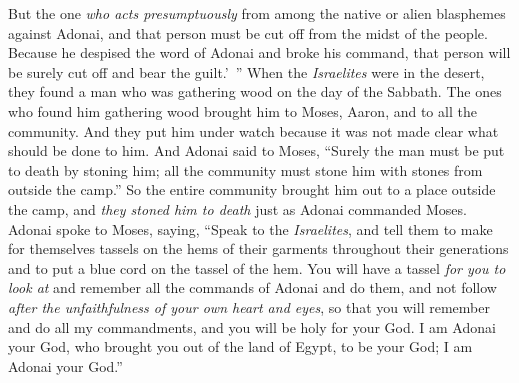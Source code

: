 \begin{biblechapter}
\verse But the one \textit{who acts presumptuously} from among the native or alien blasphemes against Adonai, and that person must be cut off from the midst of the people.
\verse Because he despised the word of Adonai and broke his command, that person will be surely cut off and bear the guilt.’ ”
 When the \textit{Israelites} were in the desert, they found a man who was gathering wood on the day of the Sabbath.
\verse The ones who found him gathering wood brought him to Moses, Aaron, and to all the community.
\verse And they put him under watch because it was not made clear what should be done to him.
\verse And Adonai said to Moses, “Surely the man must be put to death by stoning him; all the community must stone him with stones from outside the camp.”
\verse So the entire community brought him out to a place outside the camp, and \textit{they stoned him to death} just as Adonai commanded Moses.
 Adonai spoke to Moses, saying,
\verse “Speak to the \textit{Israelites}, and tell them to make for themselves tassels on the hems of their garments throughout their generations and to put a blue cord on the tassel of the hem.
\verse You will have a tassel \textit{for you to look at} and remember all the commands of Adonai and do them, and not follow \textit{after the unfaithfulness of your own heart and eyes},
\verse so that you will remember and do all my commandments, and you will be holy for your God.
\verse I am Adonai your God, who brought you out of the land of Egypt, to be your God; I am Adonai your God.”
\end{biblechapter}

